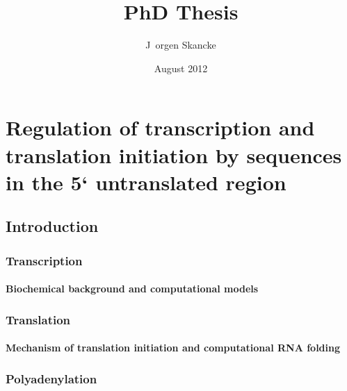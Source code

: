 \documentclass[b5paper]{report}
\title{PhD Thesis}
\author{J\ orgen Skancke}
\date{August 2012}
\begin{document}
 


\maketitle

\part{Regulation of transcription and translation initiation by sequences in
the 5` untranslated region}

\chapter{Introduction}



\section{Transcription}

\subsection{Biochemical background and computational models}



\section{Translation}

\subsection{Mechanism of translation initiation and computational RNA folding}

%

\section{Polyadenylation}
%
\end{document}
